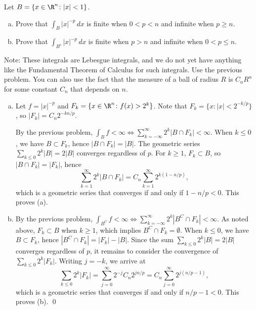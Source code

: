 \begin{hwsol}
Let $B=\{ x \in \R^n \colon |x|<1 \}$.
        \begin{enumerate}[(a)]
        \item Prove that $\int_{B} |x|^{-p} \,dx$ is finite when $0<p<n$ and infinite when $p \geq n$. 
        \item Prove that $\int_{B^c} |x|^{-p} \,dx$ is finite when $p>n$ and infinite when $0 < p \leq n$. \\
        \end{enumerate}

\noindent Note: These integrals are Lebesgue integrals, and we do not yet have anything like the Fundamental Theorem of Calculus for such integrals. Use the previous problem. You can also use the fact that the measure of a ball of radius $R$ is $C_n R^n$ for some constant $C_n$ that depends on $n$. \\

\pf \hfill
\begin{enumerate}[(a)]
\item Let $f= |x|^{-p}$ and $F_k= \{x \in \R^n \colon f(x) > 2^k \}$. Note that $F_k= \{ x \colon |x| < 2^{-k/p} \}$, so $|F_k|= C_n 2^{-kn/p}$.   

By the previous problem, $\int_B f < \infty \iff \sum_{k= -\infty}^\infty 2^k |B \cap F_k| < \infty$. When $k \leq 0$, we have $B \subset F_k$, hence $|B \cap F_k|=|B|$. The geometric series $\sum_{k \leq 0}2^k |B|= 2|B|$ converges regardless of $p$. For $k \geq 1$, $F_k \subset B$, so $|B  \cap F_k|= |F_k|$, hence 
        \[
        \sum_{k=1}^\infty 2^k |B \cap F_k|= C_n \sum_{k=1}^\infty 2^{k(1-n/p)},
        \]
which is a geometric series that converges if and only if $1-n/p < 0$. This proves (a). 

\item By the previous problem, $\int_{B^C} f < \infty \iff \sum_{k=-\infty}^\infty 2^k |B^C \cap F_k | < \infty$. As noted above, $F_k \subset B$ when $k \geq 1$, which implies $B^C \cap F_k= \emptyset$. When $k \leq 0$, we have $B \subset F_k$, hence $|B^C \cap F_k|= |F_k|-|B|$. Since the sum $\sum_{k \leq 0}2^k |B|= 2|B|$ converges regardless of $p$, it remains to consider the convergence of $\sum_{k \leq 0} 2^k |F_k|$. Writing $j= -k$, we arrive at 
        \[
        \sum_{k \leq 0} 2^k |F_k|= \sum_{j=0}^\infty 2^{-j} C_n 2^{j n/p}= C_n \sum_{j=0}^\infty    2^{j (n/p - 1)},
        \]
which is a geometric series that converges if and only if $n/p - 1 < 0$. This proves (b). \qed \\
\end{enumerate}
\end{hwsol}


